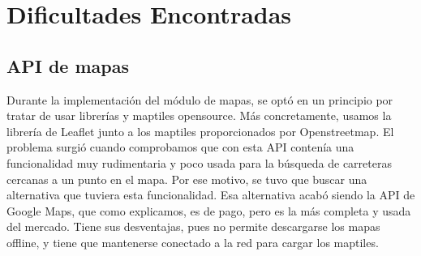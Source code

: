 \section{Dificultades Encontradas\label{SEC:DIFICULTAD}}
  \subsection{API de mapas}
    Durante la implementación del módulo de mapas, se optó en un principio por tratar de usar librerías y maptiles opensource. Más concretamente, usamos la librería de Leaflet junto a los maptiles proporcionados por Openstreetmap.
    El problema surgió cuando comprobamos que con esta API contenía una funcionalidad muy rudimentaria y poco usada para la búsqueda de carreteras cercanas a un punto en el mapa.
    Por ese motivo, se tuvo que buscar una alternativa que tuviera esta funcionalidad. Esa alternativa acabó siendo la API de Google Maps, que como explicamos, es de pago, pero es la más completa y usada del mercado.
    Tiene sus desventajas, pues no permite descargarse los mapas offline, y tiene que mantenerse conectado a la red para cargar los maptiles.
